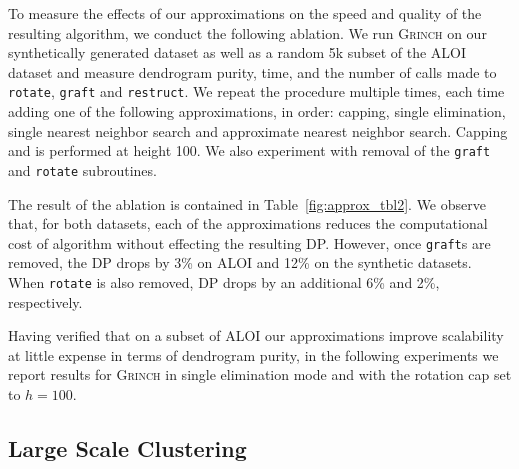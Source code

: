\documentclass{article} \usepackage[utf8]{inputenc} \usepackage[T1]{fontenc}    \usepackage{hyperref}       \usepackage{url}            \usepackage{booktabs}       \usepackage{amsfonts}       \usepackage{nicefrac}       \usepackage{microtype}      \usepackage{geometry}
\newcommand{\alg}{\textsc{Grinch}\xspace}
\newcommand{\graft}{\texttt{graft}\xspace}
\newcommand{\grafts}{\texttt{graft}s\xspace}
\newcommand{\rotate}{\texttt{rotate}\xspace}
\newcommand{\rst}{\texttt{restruct}\xspace}
\begin{document}
To measure the effects of our approximations on the speed and quality
of the resulting algorithm, we conduct the following ablation. We run
\alg on our synthetically generated dataset as well as a random 5k
subset of the \textsc{ALOI}~\cite{geusebroek2005amsterdam} dataset and
measure dendrogram purity, time, and the number of calls made to
\rotate, \graft and \rst.  We repeat the procedure multiple
times, each time adding one of the following approximations, in order:
capping, single elimination, single nearest neighbor search and
approximate nearest neighbor search. Capping and is performed at
height 100.  We also experiment with removal of the \graft and \rotate
subroutines.

The result of the ablation is contained in
Table~\ref{fig:approx_tbl2}. We observe that, for both datasets, each
of the approximations reduces the computational cost of algorithm
without effecting the resulting DP. However, once \grafts are removed,
the DP drops by 3\% on ALOI and 12\% on the synthetic datasets. When
\rotate is also removed, DP drops by an additional 6\% and 2\%,
respectively.

Having verified that on a subset of ALOI our approximations improve
scalability at little expense in terms of dendrogram purity, in the
following experiments we report results for \alg in single elimination
mode and with the rotation cap set to $h=100$.

\subsection{Large Scale Clustering}
\label{subsec:xcluster}
\end{document}

